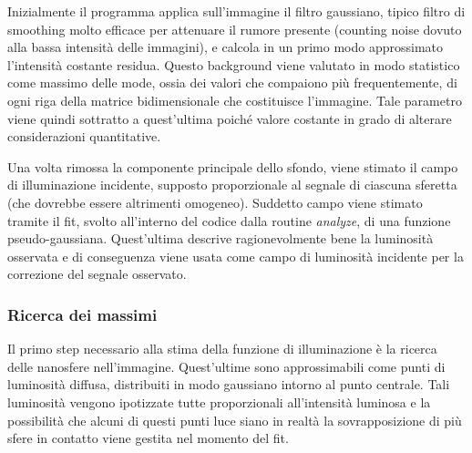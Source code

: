 Inizialmente il programma applica sull'immagine il filtro gaussiano, tipico filtro di smoothing molto efficace per attenuare il rumore presente (counting noise dovuto alla bassa intensità delle immagini), e calcola in un primo modo approssimato l'intensità costante residua.
Questo background viene valutato in modo statistico come massimo delle mode, ossia dei valori che compaiono più frequentemente, di ogni riga della matrice bidimensionale che costituisce l'immagine. 
Tale parametro viene quindi sottratto a quest'ultima poiché valore costante in grado di alterare considerazioni quantitative.

Una volta rimossa la componente principale dello sfondo, viene stimato il campo di illuminazione incidente, supposto proporzionale al segnale di ciascuna sferetta (che dovrebbe essere altrimenti omogeneo).
Suddetto campo viene stimato tramite il fit, svolto all'interno del codice dalla routine \textit{analyze}, di una funzione pseudo-gaussiana.
Quest'ultima descrive ragionevolmente bene la luminosità osservata e di conseguenza viene usata come campo di luminosità incidente per la correzione del segnale osservato.


\subsubsection*{Ricerca dei massimi}

Il primo step necessario alla stima della funzione di illuminazione è la ricerca delle nanosfere nell'immagine.
Quest'ultime sono approssimabili come punti di luminosità diffusa, distribuiti in modo gaussiano intorno al punto centrale.
Tali luminosità vengono ipotizzate tutte proporzionali all'intensità luminosa e la possibilità che alcuni di questi punti luce siano in realtà la sovrapposizione di più sfere in contatto viene gestita nel momento del fit.

